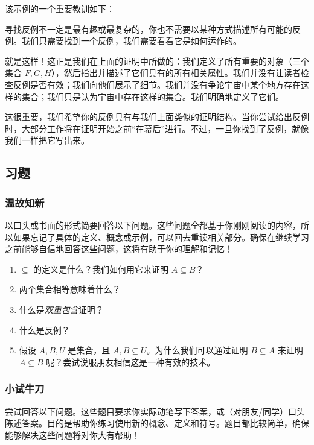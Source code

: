 该示例的一个重要教训如下：

\begin{center}
    寻找反例不一定是最有趣或最复杂的，你也不需要以某种方式描述所有可能的反例。我们只需要找到一个反例，我们需要看看它是如何运作的。
\end{center}

就是这样！这正是我们在上面的证明中所做的：我们定义了所有重要的对象（三个集合 $F,G,H$），然后指出并描述了它们具有的所有相关属性。我们并没有让读者检查反例是否有效；我们向他们展示了细节。我们并没有争论宇宙中某个地方存在这样的集合；我们只是认为宇宙中存在这样的集合。我们明确地定义了它们。

这很重要，我们希望你的反例具有与我们上面类似的证明结构。当你尝试给出反例时，大部分工作将在证明开始之前``在幕后''进行。不过，一旦你找到了反例，就像我们一样把它写出来。

\subsection{习题}

\subsubsection*{温故知新}

以口头或书面的形式简要回答以下问题。这些问题全都基于你刚刚阅读的内容，所以如果忘记了具体的定义、概念或示例，可以回去重读相关部分。确保在继续学习之前能够自信地回答这些问题，这将有助于你的理解和记忆！

\begin{enumerate}[label=(\arabic*)]
    \item $\subseteq$ 的定义是什么？我们如何用它来证明 $A \subseteq B$？
    \item 两个集合相等意味着什么？
    \item 什么是\emph{双重包含}证明？
    \item 什么是反例？
    \item 假设 $A,B,U$ 是集合，且 $A,B \subseteq U$。为什么我们可以通过证明 $\overline{B} \subseteq \overline{A}$ 来证明 $A \subseteq B$ 呢？尝试说服朋友相信这是一种有效的技术。
\end{enumerate}

\subsubsection*{小试牛刀}

尝试回答以下问题。这些题目要求你实际动笔写下答案，或（对朋友/同学）口头陈述答案。目的是帮助你练习使用新的概念、定义和符号。题目都比较简单，确保能够解决这些问题将对你大有帮助！

